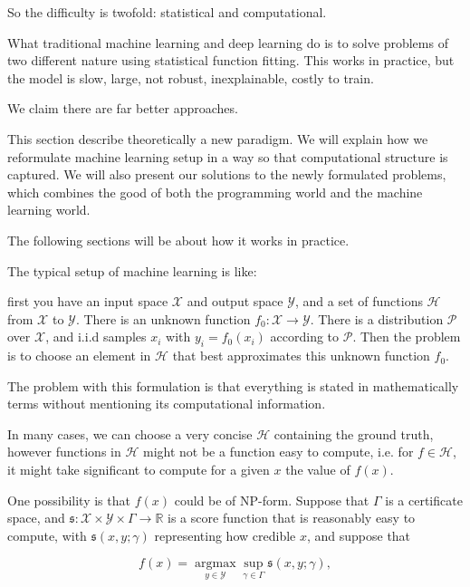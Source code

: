 \documentclass[11pt]{article} 	%
\theoremstyle{definition}
\begin{document}
So the difficulty is twofold: statistical and computational.

What traditional machine learning and deep learning do is to solve problems of two different nature using statistical function fitting.
This works in practice, but the model is slow, large, not robust, inexplainable, costly to train.

We claim there are far better approaches.

This section describe theoretically a new paradigm.
We will explain how we reformulate machine learning setup in a way so that computational structure is captured.
We will also present our solutions to the newly formulated problems, which combines the good of both the programming world and the machine learning world.

The following sections will be about how it works in practice.


The typical setup of machine learning is like:

first you have an input space $\mathcal{X}$ and output space $\mathcal{Y}$, and a set of functions $\mathcal{H}$ from $\mathcal{X}$ to $\mathcal{Y}$.
There is an unknown function $f_0:\mathcal{X}\to \mathcal{Y}$.
There is a distribution $\mathcal{P}$ over $\mathcal{X}$, and i.i.d samples $x_i$ with $y_i=f_0(x_i)$ according to $\mathcal{P}$.
Then the problem is to choose an element in  $\mathcal{H}$ that best approximates this unknown function  $f_0$.

The problem with this formulation is that everything is stated in mathematically terms without mentioning its computational information.

 In many cases, we can choose a very concise $\mathcal{H}$ containing the ground truth, however functions in $\mathcal{H}$ might not be a function easy to compute, i.e. for $f\in \mathcal{H}$,
 it might take significant to compute for a given $x$ the value of $f(x)$.

 One possibility is that $f(x)$ could be of NP-form. Suppose that $\Gamma$ is a certificate space, and $\mathfrak{s}: \mathcal{X}\times \mathcal{Y}\times \Gamma\to \mathbb{R}$ is a score function that is reasonably easy to compute, with $\mathfrak{s}(x,y;\gamma)$ representing how credible $x$, and suppose that

 \begin{equation}
 	f(x)=\mathop{\text{argmax}}\limits_{y\in \mathcal{Y}}\sup_{\gamma\in \Gamma}\mathfrak{s}(x, y; \gamma),
 \end{equation}
\end{document}
